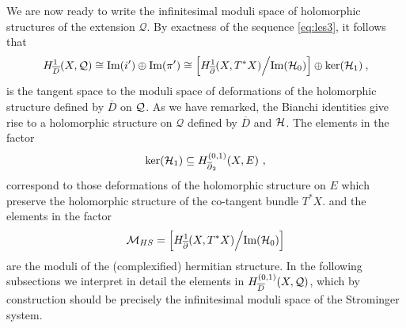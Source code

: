 \documentclass[12pt,a4paper]{article}
\def\bar#1{\overline{#1}}
\def\Im{\textrm{Im}}
\def\ker{\textrm{ker}}
\def\bp{\bar{\partial}}
\def\Q{\mathcal{Q}}
\theoremstyle{definition}
\begin{document}
We are now ready to write the infinitesimal moduli space of holomorphic structures of the extension $\Q$. By exactness of the sequence \eqref{eq:les3}, it follows that
\begin{equation}
\label{eq:defBI}
H_{\bar D}^1(X, \Q)\cong\Im(i')\oplus\Im(\pi')\cong \Big[H_{\bp}^1(X,T^*X)\Big/\textrm{Im}({\cal H}_0)\Big]\oplus\ker({\cal H}_1)\:,
\end{equation}
is the tangent space to the moduli space of deformations of the holomorphic structure defined by $\bar D$  on $\cal Q$.
As we have remarked, the Bianchi identities give rise to a holomorphic structure on $\Q$ defined by $\bar D$ and $\cal H$. The elements in the factor 
\[\ker({\cal H}_1)\subseteq H_{\bp_2}^{(0,1)}(X, E)~,\]
 correspond to those deformations of the holomorphic structure on $E$ which preserve the holomorphic structure of the co-tangent bundle $T^*X$. and the elements in the factor 
\[ {\cal M}_{HS} = \Big[H_{\bp}^1(X,T^*X)\Big/\textrm{Im}({\cal H}_0)\Big]\]
are the moduli of the (complexified) hermitian structure. 
In the following subsections we interpret in detail the elements in $H_{\bar D}^{(0,1)}(X,{\cal Q})$,  which by construction should be precisely the infinitesimal moduli space of the Strominger system. 
\end{document}
